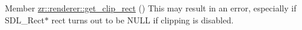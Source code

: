 
\begin{DoxyRefList}
\item[Member \mbox{\hyperlink{classzr_1_1renderer_a1a93b15028f2bc27b2051bc912a70b4b}{zr::renderer::get\+\_\+clip\+\_\+rect}} ()]\label{todo__todo000001}%
%
This may result in an error, especially if S\+D\+L\+\_\+\+Rect$\ast$ rect turns out to be N\+U\+LL if clipping is disabled. 
\end{DoxyRefList}
